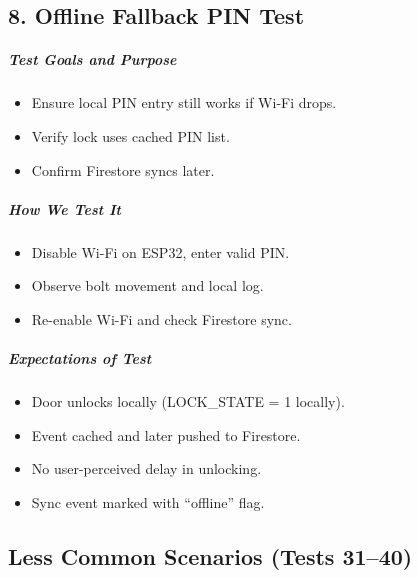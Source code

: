 \subsection*{8. Offline Fallback PIN Test}
\subparagraph{Test Goals and Purpose}
\begin{itemize}
    \item Ensure local PIN entry still works if Wi-Fi drops.
    \item Verify lock uses cached PIN list.
    \item Confirm Firestore syncs later.
\end{itemize}
\subparagraph{How We Test It}
\begin{itemize}
    \item Disable Wi-Fi on ESP32, enter valid PIN.
    \item Observe bolt movement and local log.
    \item Re-enable Wi-Fi and check Firestore sync.
\end{itemize}
\subparagraph{Expectations of Test}
\begin{itemize}
    \item Door unlocks locally (LOCK\_STATE = 1 locally).
    \item Event cached and later pushed to Firestore.
    \item No user-perceived delay in unlocking.
    \item Sync event marked with “offline” flag.
\end{itemize}
























\newpage
\subsection*{Less Common Scenarios (Tests 31–40)}

